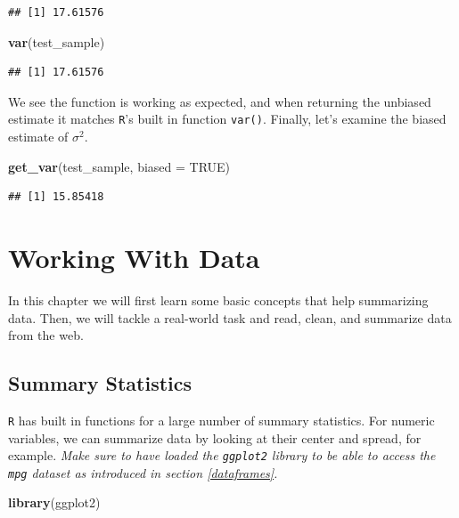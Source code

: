 \documentclass[]{book}
\newenvironment{Shaded}{\begin{snugshade}}{\end{snugshade}}
\newcommand{\KeywordTok}[1]{\textcolor[rgb]{0.13,0.29,0.53}{\textbf{#1}}}
\newcommand{\DataTypeTok}[1]{\textcolor[rgb]{0.13,0.29,0.53}{#1}}
\newcommand{\OtherTok}[1]{\textcolor[rgb]{0.56,0.35,0.01}{#1}}
\newcommand{\NormalTok}[1]{#1}
\theoremstyle{definition}
\theoremstyle{definition}
\theoremstyle{definition}
\theoremstyle{remark}
\begin{document}
\begin{verbatim}
## [1] 17.61576
\end{verbatim}

\begin{Shaded}
\begin{Highlighting}[]
\KeywordTok{var}\NormalTok{(test_sample)}
\end{Highlighting}
\end{Shaded}

\begin{verbatim}
## [1] 17.61576
\end{verbatim}

We see the function is working as expected, and when returning the
unbiased estimate it matches \texttt{R}'s built in function
\texttt{var()}. Finally, let's examine the biased estimate of
\(\sigma^2\).

\begin{Shaded}
\begin{Highlighting}[]
\KeywordTok{get_var}\NormalTok{(test_sample, }\DataTypeTok{biased =} \OtherTok{TRUE}\NormalTok{)}
\end{Highlighting}
\end{Shaded}

\begin{verbatim}
## [1] 15.85418
\end{verbatim}

\chapter{Working With Data}\label{sum}

In this chapter we will first learn some basic concepts that help
summarizing data. Then, we will tackle a real-world task and read,
clean, and summarize data from the web.

\section{Summary Statistics}\label{summary-statistics}

\texttt{R} has built in functions for a large number of summary
statistics. For numeric variables, we can summarize data by looking at
their center and spread, for example. \emph{Make sure to have loaded the
\texttt{ggplot2} library to be able to access the \texttt{mpg} dataset
as introduced in section \ref{dataframes}.}

\begin{Shaded}
\begin{Highlighting}[]
\KeywordTok{library}\NormalTok{(ggplot2)}
\end{Highlighting}
\end{Shaded}
\end{document}
